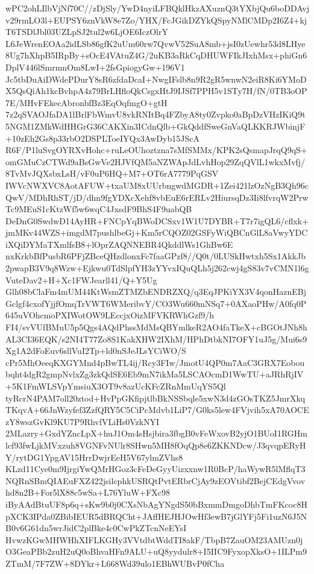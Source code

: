 \documentclass[multi=frame]{standalone}
\begin{document}
\begin{world}
        wPC2ohLIlbVjNf70C//zDjSly/YwD4nyiLFBQklHkzAXuznQ3tYXbjQu6boDDAvjv29rmLO3l+EUPSY6znVkW8e7Zo/YHX/FcJGikDZYkQSpyNMlCMDp2I6Z4+kjT6TSDlJbl03UZLpSJ2tul2w6LjOE6IczOlrY
        L6JeWrenEOAa2idLSb86gfK2uUm60rw7QvwV52SuA8mb+jsI0zUewhr53d8LHye8Ug7hXhpB5IRpBy+sOcE4VAtuZ4G/2uKB3aRkCqDHUWFIkJIxhMsx+phiGn6DplV446lSmrmnOm8LwI+2fsGpiogyGw+196V1
        Jc5tbDuAiDWdePDurY8sR6zfdaDcaI+NwgIFslb8n9R2gR5wnwN2eiR8Ki6YMoDX5QsQiAh1kcBvhpA4z79BrLHfloQkCsgxHtJ9IJSf7PPH5v1STy7H/fN/0TB3oOP7E/MHvFEkecAbronbfBz3EqOqfmgO+gtH
        7z2qSVAOJfaDA1lBrlFbWmvU8vkRNItBq4FZbyA8ty0Zvpko0aBpDzVHzIKiQ9t5NGM1ZMkWdHHGrG36CAKXin3ICdnQlb+GkQddfSweGnVaQLKKRJWbinjF+10zEh2Gs8p33rbO2DSPLToeIYQx3AwDyb15JScA
        R6F/P1luSvgOYRXvHohc+ruLeOUhoztzna7sMfSMMx/KPK2sQsmapJrqQ9qS+omGMuCzCTWd9aBsGwVe2HJVfQM5aNZWApJdLvhHop29ZqQVlL1wkxMvfj/8TvMvJQXsbxLsH/vF0uP6HQ+M7+OT6rA7779PqGSV
        IWVcNWXVC8AotAFUW+txaUM8xUUrbngwdMGDR+1Zei421lzOzNgB3Qh96cQwV/MDhRhST/jD/dhn9fgYDXcXehf8vbEuE6rERLv2HiursqDz3Ii8lfvrqW2PrwTc9MEuS1cKtzWf5w6wqC4JxsdF9BhS4F9uabQB
        DeDnG0SwdwD14AyHR+FNCpYqBWoDCSxv1W1U7DYBR+T7r7igQL6/cflxk+jmMKv44WZS+imgdM7pushlbeGj+Km5rCQOZ02GSFyWiQBCnGlL8aVwyYDCiXQiDYMaTXmlfsB8+lOprZAQNNEBR4QkddlWs1GhBw6E
        nxKrkbBfPusbR6PFjZBceQHzdlonxFc7faaGPzf8//Q0t/0LUSkHwtxh5Sx1AkkJb2pwapB3V9q8Wzw+Ejkwu0TdSlpfYH3zYYvxIQuQLh5j262cwj4gS83v7vCMN1l6gVuteDav2+H+Xc1FWJearll41/Q+Y5Ug
        Glh08bClaFm4mUM44KtWsmZTMZbENDRZXQ/q3EqJPKiYX3V4qonHaznEBjGclgf4cxofYjjfOmqTrVWT6WMeribvY/CO3Wu660mNSq7+0AXaoPHw/A0fq0P645uVOhcmoPXIWotOW9LEccjxOizMFVKRWhGzf9/h
        FI4/svVUfBMuU5p5Qgs4AQdPhssMdMsQBYmlkeR2AO4faTkeX+cBGOtJNh8hAL3CI36EQK/s2NI4T77Zo8S1KakXHW2IXhM/HPhDtbkNI7OFY1uJ5g/Mui6s9Xg1A2dFoEuv6sllVuI2Tp+ld0nSJeJLsYCiWO/S
        cPr5MhOeeqKXGYMnd4pBwTL4ij/Rcy3FIw/JmotU4QP0m7AaC3GRX7Eoboubqht4dgR2gmpNvlxZg3zkQdSE6Eb9mN7ikMa5LSCAOcmD1WwTU+aJRhRjIV+5K1FmWLSVpYmsiuX3OT9v8azUcKFcZRnMmUqYS5Ql
        tyRcrN4PAM7oll20ztod+HvPpGKfipjtlbBkNSSbqle5xwN3d4zGOsTKZ5JmrXkqTKqvA+66JnWzyfef3ZzfQRY5C5CiPcMdvb1LiP7/G0ks5lew4FVjvih5xA70AOCEzY8wszGvKl9KU7P9RhvfVLiHs0VzkNYI
        2MLazry+GxdYZncLpX+huJ1Om4sHsjbira3fbgB0vFeWxovB2yjO1BUoI1RGHmlcf93fwLjkMVxzuh8VGNFvNUlr8SHwn5MH8fOqQp8e6ZKKNDcw/J3qvqpERyHY/rytDG1YpgAV15HrrDwjrEeH5V67ylmZVhs8
        KLzd11Cye0m9IjrgiYwQMrHGoz3cFeDeGyyUizxxnw1R0BcP/haWywR5lMflqT3NQRnSBmQIAEuFXZ422jsilcphkUSRQtPvtERbrCjAy9zEOVtibf2BejCEdgVvovhd8n2B+For5lX88c5wSa+L76YluW+FXc98
        iByAAdBtuUF8p6q+sKw9b0j0CXsNbAgYNgdS50bBxmmDmgoDhbTmFKcoc8HpXCK3IPda0ZBibIEUR5dBRQCht+JAffHEJHJOwHf3ewB7jGlYFj5Fi1uzN6J5NB0v6G61dn5wrJidC2plBke4c0CwPkZTcnNeEYsI
        HvwzKGwMHWHhXIFLKGHy3VVtdbtWddTI8akF/TbpB7ZauOM23AMUzn0jO3GeaPBb2zuH2uQ0oBhvaHFn9ALU+uQ8yydulr8+I5IIC9FyxopXksO+1ILPm9ZTmM/7F7ZW+8DYkr+L668Wd39ulo1EBhWUBvP0fCha

\end{world}
\end{document}
